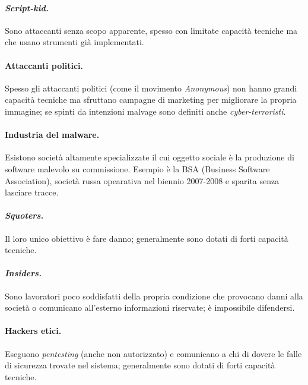 \documentclass[a4page, 11pt, twocolumn]{article}
\begin{document}
\paragraph{\textit{Script-kid.}} Sono attaccanti senza scopo apparente, spesso con limitate capacità tecniche ma che usano strumenti già implementati.
\paragraph{Attaccanti politici.} Spesso gli attaccanti politici (come il movimento \textit{Anonymous}) non hanno grandi capacità tecniche ma sfruttano campagne di marketing per migliorare la propria immagine; se spinti da intenzioni malvage sono definiti anche \textit{cyber-terroristi}.
\paragraph{Industria del malware.} Esistono società altamente specializzate il cui oggetto sociale è la produzione di software malevolo su commissione.
Esempio è la BSA (Business Software Association), società russa opearativa nel biennio 2007-2008 e sparita senza lasciare tracce.
\paragraph{\textit{Squoters.}} Il loro unico obiettivo è fare danno; generalmente sono dotati di forti capacità tecniche.
\paragraph{\textit{Insiders.}} Sono lavoratori poco soddisfatti della propria condizione che provocano danni alla società o comunicano all'esterno informazioni riservate; è impossibile difendersi.
\paragraph{Hackers etici.} Eseguono \textit{pentesting} (anche non autorizzato) e comunicano a chi di dovere le falle di sicurezza trovate nel sistema; generalmente sono dotati di forti capacità tecniche.
\end{document}
